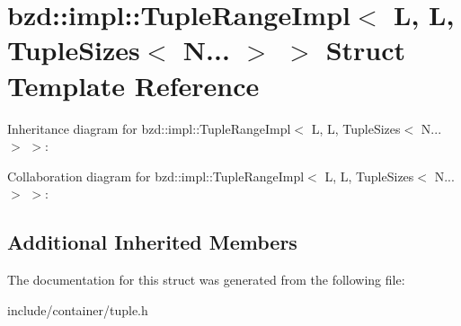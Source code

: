 \hypertarget{structbzd_1_1impl_1_1TupleRangeImpl_3_01L_00_01L_00_01TupleSizes_3_01N_8_8_8_01_4_01_4}{}\section{bzd\+:\+:impl\+:\+:Tuple\+Range\+Impl$<$ L, L, Tuple\+Sizes$<$ N... $>$ $>$ Struct Template Reference}
\label{structbzd_1_1impl_1_1TupleRangeImpl_3_01L_00_01L_00_01TupleSizes_3_01N_8_8_8_01_4_01_4}


Inheritance diagram for bzd\+:\+:impl\+:\+:Tuple\+Range\+Impl$<$ L, L, Tuple\+Sizes$<$ N... $>$ $>$\+:


Collaboration diagram for bzd\+:\+:impl\+:\+:Tuple\+Range\+Impl$<$ L, L, Tuple\+Sizes$<$ N... $>$ $>$\+:
\subsection*{Additional Inherited Members}


The documentation for this struct was generated from the following file\+:\begin{DoxyCompactItemize}
\item 
include/container/tuple.\+h\end{DoxyCompactItemize}
